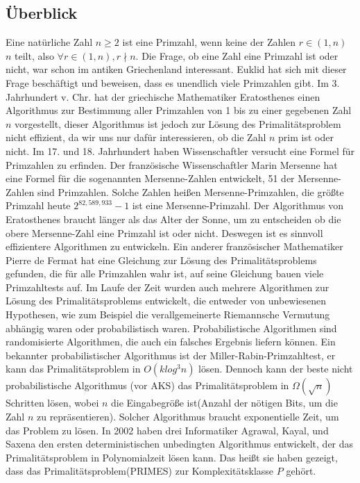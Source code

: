 \documentclass[12pt,oneside]{article}
\theoremstyle{remark}
\theoremstyle{definition}
\begin{document}
\subsection{Überblick}
Eine natürliche Zahl $n \geq 2$ ist eine Primzahl, wenn keine der Zahlen $r \in (1,n)$ $n$ teilt, also $\forall r \in (1,n), r \nmid n$. Die Frage, ob eine Zahl eine Primzahl ist oder nicht, war schon im antiken Griechenland interessant. Euklid hat sich mit dieser Frage beschäftigt und beweisen, dass es unendlich viele Primzahlen gibt. Im 3. Jahrhundert v. Chr. hat der griechische Mathematiker Eratosthenes einen Algorithmus zur Bestimmung aller Primzahlen von 1 bis zu einer gegebenen Zahl $n $ vorgestellt, dieser Algorithmus ist jedoch zur Lösung des Primalitätsproblem nicht effizient, da wir uns nur dafür interessieren, ob die Zahl $n$ prim ist oder nicht. Im 17. und 18. Jahrhundert haben Wissenschaftler versucht eine Formel für Primzahlen zu erfinden. Der französische Wissenschaftler Marin Mersenne hat eine Formel für die sogenannten Mersenne-Zahlen entwickelt, 51 der Mersenne-Zahlen sind Primzahlen. Solche Zahlen heißen Mersenne-Primzahlen, die größte Primzahl heute $2^{82,589,933} − 1$ ist eine Mersenne-Primzahl. Der Algorithmus von Eratosthenes braucht länger als das Alter der Sonne, um zu entscheiden ob die obere Mersenne-Zahl eine Primzahl ist oder nicht. Deswegen ist es sinnvoll effizientere Algorithmen zu entwickeln. Ein anderer französischer Mathematiker Pierre de Fermat hat eine Gleichung zur Lösung des Primalitätsproblems gefunden, die für alle Primzahlen wahr ist, auf seine Gleichung bauen viele Primzahltests auf. \newline\newline
Im Laufe der Zeit wurden auch mehrere Algorithmen zur Lösung des Primalitätsproblems entwickelt, die entweder von unbewiesenen Hypothesen, wie zum Beispiel die verallgemeinerte Riemannsche Vermutung abhängig waren oder probabilistisch waren. Probabilistische Algorithmen sind randomisierte Algorithmen, die auch ein falsches Ergebnis liefern können. Ein bekannter probabilistischer Algorithmus ist der Miller-Rabin-Primzahltest, er kann das Primalitätsproblem in $O(k log^3 n)$ lösen. Dennoch kann der beste nicht probabilistische Algorithmus (vor AKS) das Primalitätsproblem in $ \Omega(\sqrt{n}) $ Schritten lösen, wobei $n$ die Eingabegröße ist(Anzahl der nötigen Bits, um die Zahl $n$ zu repräsentieren). Solcher Algorithmus braucht exponentielle Zeit, um das Problem zu lösen. In 2002 haben drei Informatiker Agrawal, Kayal, und Saxena den ersten deterministischen unbedingten Algorithmus entwickelt, der das Primalitätsproblem in Polynomialzeit lösen kann. Das heißt sie haben gezeigt, dass das Primalitätsproblem(PRIMES) zur Komplexitätsklasse $P$ gehört.      
\end{document}
